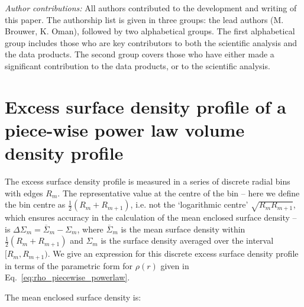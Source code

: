 \documentclass[usenatbib]{mnras}
\begin{document}
\emph{Author contributions:} All authors contributed to the development and writing of this paper. The authorship list is given in three groups: the lead authors (M. Brouwer, K. Oman), followed by two alphabetical groups. The first alphabetical group includes those who are key contributors to both the scientific analysis and the data products. The second group covers those who have either made a significant contribution to the data products, or to the scientific analysis.










\appendix
\onecolumn
\section{Excess surface density profile of a piece-wise power law volume density profile}
\label{sec:appendix_invert_esd}

\noindent The excess surface density profile is measured in a series of discrete radial bins with edges $R_m$. The representative value at the centre of the bin -- here we define the bin centre as $\frac{1}{2}(R_m+R_{m+1})$, i.e. not the `logarithmic centre' $\sqrt{R_mR_{m+1}}$, which ensures accuracy in the calculation of the mean enclosed surface density -- is $\Delta\Sigma_m=\overline{\Sigma}_m-\Sigma_m$, where $\overline{\Sigma}_m$ is the mean surface density within $\frac{1}{2}(R_m+R_{m+1})$ and $\Sigma_m$ is the surface density averaged over the interval $[R_m,R_{m+1})$. We give an expression for this discrete excess surface density profile in terms of the parametric form for $\rho(r)$ given in Eq.~\ref{eq:rho_piecewise_powerlaw}.

The mean enclosed surface density is:
\end{document}
